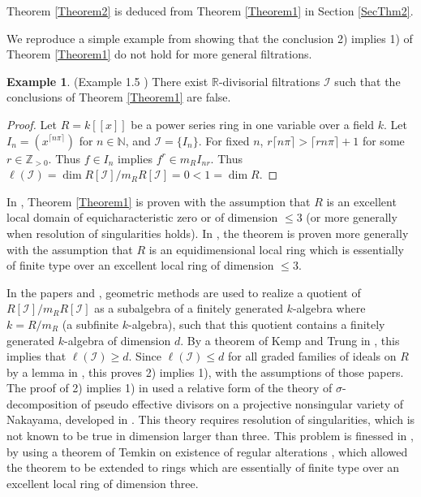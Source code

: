 \documentclass[11pt]{amsart}
\def\NZQ{\mathbb}               %
\def\NN{{\NZQ N}}
\def\ZZ{{\NZQ Z}}
\def\RR{{\NZQ R}}
\theoremstyle{definition}
\newtheorem{Example}[Theorem]{Example}
\begin{document}
 Theorem \ref{Theorem2} is deduced from Theorem \ref{Theorem1} in Section \ref{SecThm2}.
 
 We reproduce a simple example from \cite{C1} showing that 
 the conclusion 2) implies 1) of Theorem \ref{Theorem1} do not hold for more general filtrations.

\begin{Example}(Example 1.5 \cite{C1}) There exist $\RR$-divisorial filtrations $\mathcal I$ such that 
the conclusions of Theorem \ref{Theorem1} are false. 
\end{Example}

\begin{proof} Let $R=k[[x]]$ be a power series ring in one variable over a field $k$. Let $I_n=(x^{\lceil n\pi\rceil})$ for $n\in \NN$, and $\mathcal I=\{I_n\}$. For fixed $n$, $r\lceil n\pi\rceil>\lceil rn\pi\rceil +1$ for some  $r\in \ZZ_{>0}$. Thus $f\in I_n$ implies $f^r\in m_RI_{nr}$. Thus $\ell(\mathcal I)=\dim R[\mathcal I]/m_RR[\mathcal I]=0<1=\dim R$.
\end{proof} 
 
 
 In \cite{C1}, Theorem \ref{Theorem1} is proven with the assumption that $R$ is an excellent local domain of equicharacteristic zero or of dimension $\le 3$ (or more generally when resolution of singularities holds). In \cite{C2}, the theorem is proven more generally with the assumption that $R$ is an equidimensional local ring which is essentially of finite type over an excellent local ring of dimension $\le 3$.

In the papers \cite{C1} and \cite{C2}, geometric methods are used to realize a quotient of 
\linebreak $R[\mathcal I]/m_RR[\mathcal I]$ as a subalgebra of a finitely generated $k$-algebra where  $k=R/m_R$ (a subfinite $k$-algebra), such that this quotient contains a finitely generated $k$-algebra of dimension $d$. By a theorem of Kemp and Trung in \cite{KT}, this implies that $\ell(\mathcal I)\ge d$. Since $\ell(\mathcal I)\le d$ for all graded families of ideals on $R$ by a lemma in \cite{CPS}, this proves 2) implies 1), with the assumptions of those papers. The proof of 2) implies 1) in \cite{C1} used a relative form of the theory of $\sigma$-decomposition of pseudo effective divisors on a projective nonsingular variety of Nakayama, developed in \cite{N}. This theory requires resolution of singularities, which is not known to be true in dimension larger than three. This problem is finessed in \cite{C2}, by using a theorem of Temkin on existence of regular alterations \cite{T}, which allowed the theorem to be extended to rings which are essentially of finite type over an excellent local ring of dimension three. 
\end{document}
